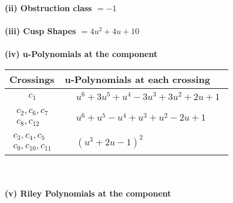 \documentclass[1p]{elsarticle_modified}
\theoremstyle{definition}
\begin{document}
\flushleft \textbf{(ii) Obstruction class $= -1$}\\~\\
\flushleft \textbf{(iii) Cusp Shapes $= 4 u^2+4 u+10$}\\~\\
\newpage\renewcommand{\arraystretch}{1}
\flushleft \textbf{(iv) u-Polynomials at the component}\newline \\
\begin{tabular}{m{50pt}|m{274pt}}
Crossings & \hspace{64pt}u-Polynomials at each crossing \\
\hline $$\begin{aligned}c_{1}\end{aligned}$$&$\begin{aligned}
&u^6+3 u^5+u^4-3 u^3+3 u^2+2 u+1
\end{aligned}$\\
\hline $$\begin{aligned}c_{2},c_{6},c_{7}\\c_{8},c_{12}\end{aligned}$$&$\begin{aligned}
&u^6+u^5- u^4+u^3+u^2-2 u+1
\end{aligned}$\\
\hline $$\begin{aligned}c_{3},c_{4},c_{5}\\c_{9},c_{10},c_{11}\end{aligned}$$&$\begin{aligned}
&(u^3+2 u-1)^2
\end{aligned}$\\
\hline
\end{tabular}\\~\\
\newpage\renewcommand{\arraystretch}{1}
\flushleft \textbf{(v) Riley Polynomials at the component}\newline \\
\end{document}
